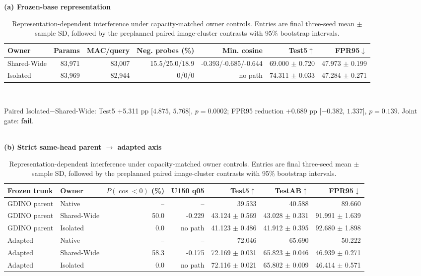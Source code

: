 \begin{table}[t]
\centering
\caption{Representation-dependent interference under capacity-matched owner
controls.  Entries are final three-seed mean $\pm$ sample SD, followed by the
preplanned paired image-cluster contrasts with 95\% bootstrap intervals.}
\label{tab:interference}
\scriptsize
\setlength{\tabcolsep}{3.0pt}
\textbf{(a) Frozen-base representation}\\[2pt]
\begin{tabular}{lrrrrrr}
\toprule
Owner & Params & MAC/query & Neg. probes (\%) & Min. cosine & Test5$\uparrow$ & FPR95$\downarrow$ \\
\midrule
Shared-Wide & 83,971 & 83,007 & 15.5/25.0/18.9 & -0.393/-0.685/-0.644 & 69.000 $\pm$ 0.720 & 47.973 $\pm$ 0.199 \\
Isolated & 83,969 & 82,944 & 0/0/0 & no path & 74.311 $\pm$ 0.033 & 47.284 $\pm$ 0.271 \\
\bottomrule
\end{tabular}
\\[2pt]
\parbox{0.97\textwidth}{\scriptsize Paired Isolated$-$Shared-Wide: Test5
+5.311 pp
[$4.875$, $5.768$],
$p=0.0002$; FPR95 reduction
+0.689 pp
[$-0.382$, $1.337$],
$p=0.139$. Joint gate: \textbf{fail}.}
\\[5pt]
\textbf{(b) Strict same-head parent $\rightarrow$ adapted axis}\\[2pt]
\begin{tabular}{llrrrrr}
\toprule
Frozen trunk & Owner & $P(\cos<0)$ (\%) & U150 q05 & Test5$\uparrow$ & TestAB$\uparrow$ & FPR95$\downarrow$ \\
\midrule
GDINO parent & Native & -- & -- & 39.533 & 40.588 & 89.660 \\
GDINO parent & Shared-Wide & 50.0 & -0.229 & 43.124 $\pm$ 0.569 & 43.028 $\pm$ 0.331 & 91.991 $\pm$ 1.639 \\
GDINO parent & Isolated & 0.0 & no path & 41.123 $\pm$ 0.486 & 41.912 $\pm$ 0.395 & 92.680 $\pm$ 1.898 \\
Adapted & Native & -- & -- & 72.046 & 65.690 & 50.222 \\
Adapted & Shared-Wide & 58.3 & -0.175 & 72.169 $\pm$ 0.031 & 65.823 $\pm$ 0.046 & 46.939 $\pm$ 0.271 \\
Adapted & Isolated & 0.0 & no path & 72.116 $\pm$ 0.021 & 65.802 $\pm$ 0.009 & 46.414 $\pm$ 0.571 \\
\bottomrule
\end{tabular}
\\[3pt]

\end{table}
